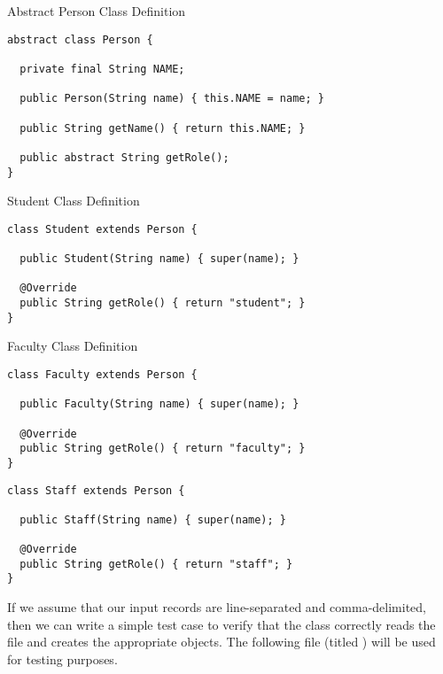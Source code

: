 \begin{cl}{Abstract Person Class Definition}
\begin{lstlisting}[language=MyJava]
abstract class Person {

  private final String NAME;

  public Person(String name) { this.NAME = name; }

  public String getName() { return this.NAME; }

  public abstract String getRole();
}
\end{lstlisting}
\end{cl}

\begin{cl}{Student Class Definition}
\begin{lstlisting}[language=MyJava]
class Student extends Person {

  public Student(String name) { super(name); }

  @Override
  public String getRole() { return "student"; }
}
\end{lstlisting}
\end{cl}

\begin{cl}{Faculty Class Definition}
\begin{lstlisting}[language=MyJava]
class Faculty extends Person {

  public Faculty(String name) { super(name); }

  @Override
  public String getRole() { return "faculty"; }
}
\end{lstlisting}
\end{cl}

\begin{cl}{}
\begin{lstlisting}[language=MyJava]
class Staff extends Person {

  public Staff(String name) { super(name); }

  @Override
  public String getRole() { return "staff"; }
}
\end{lstlisting}
\end{cl}

If we assume that our input records are line-separated and comma-delimited, then we can write a simple test case to verify that the  class correctly reads the file and creates the appropriate  objects. The following file (titled ) will be used for testing purposes.

